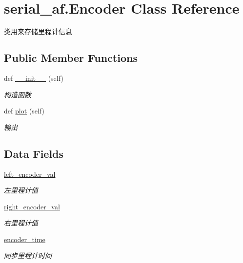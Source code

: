 \hypertarget{classserial__af_1_1_encoder}{}\section{serial\+\_\+af.\+Encoder Class Reference}
\label{classserial__af_1_1_encoder}


类用来存储里程计信息  


\subsection*{Public Member Functions}
\begin{DoxyCompactItemize}
\item 
def \hyperlink{classserial__af_1_1_encoder_ae52648d6c30aed421c3ba144646798b9}{\+\_\+\+\_\+init\+\_\+\+\_\+} (self)
\begin{DoxyCompactList}\small\item\em 构造函数 \end{DoxyCompactList}\item 
def \hyperlink{classserial__af_1_1_encoder_a6115398fbf3ad6bd333d3bddc427e97e}{plot} (self)
\begin{DoxyCompactList}\small\item\em 输出 \end{DoxyCompactList}\end{DoxyCompactItemize}
\subsection*{Data Fields}
\begin{DoxyCompactItemize}
\item 
\hyperlink{classserial__af_1_1_encoder_aee1180972126fb58727650f9a0eee613}{left\+\_\+encoder\+\_\+val}
\begin{DoxyCompactList}\small\item\em 左里程计值 \end{DoxyCompactList}\item 
\hyperlink{classserial__af_1_1_encoder_a83662eba08423b2c9ec665e1b084b3ab}{right\+\_\+encoder\+\_\+val}
\begin{DoxyCompactList}\small\item\em 右里程计值 \end{DoxyCompactList}\item 
\hyperlink{classserial__af_1_1_encoder_a97fd512d53e61b87d9b16cf67df425b3}{encoder\+\_\+time}
\begin{DoxyCompactList}\small\item\em 同步里程计时间 \end{DoxyCompactList}\end{DoxyCompactItemize}


